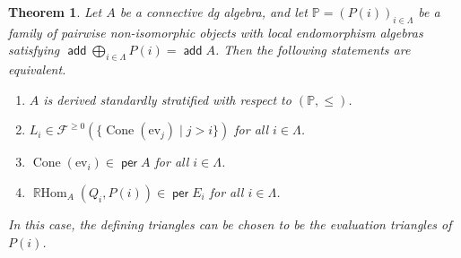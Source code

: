 \documentclass[a4paper,reqno,11pt]{amsart}
\numberwithin{equation}{section}
\newtheorem{theorem}{Theorem}[section]
\theoremstyle{definition}
\newcommand{\F}{\mathcal{F}}
\newcommand{\PP}{\mathbb{P}}
\newcommand{\ev}{\mathrm{ev}}
\DeclareMathOperator{\Co}{Cone}
\DeclareMathOperator{\add}{\mathsf{add}}
\DeclareMathOperator{\per}{\mathsf{per}}
\DeclareMathOperator{\RHom}{\mathbb{R}Hom}
\begin{document}
\begin{theorem}\label{thm:dss_characterization}
Let $A$ be a connective dg algebra, and let $\PP=(P(i))_{i\in\Lambda}$ be a family of pairwise non-isomorphic objects with local endomorphism algebras satisfying $\add\bigoplus_{i\in\Lambda}P(i)=\add A$.
Then the following statements are equivalent.
\begin{enumerate}
\item $A$ is derived standardly stratified with respect to $(\PP,\leq)$.
\item $L_{i}\in\F^{\geq 0}(\{\Co(\ev_{j})\mid j>i\})$ for all $i\in\Lambda$.
\item $\Co(\ev_{i})\in\per A$ for all $i\in\Lambda$.
\item $\RHom_{A}(Q_{i},P(i))\in\per E_{i}$ for all $i\in\Lambda$.
\end{enumerate}
In this case, the defining triangles can be chosen to be the evaluation triangles of $P(i)$.
\end{theorem}
\end{document}
